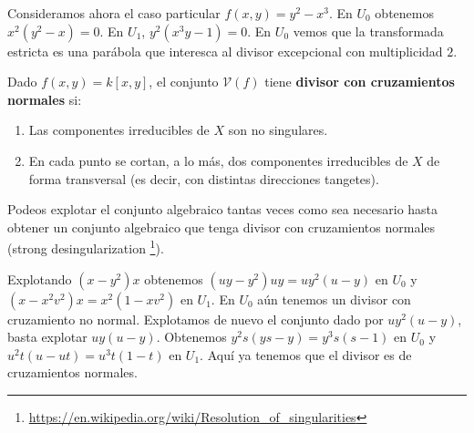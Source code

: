 \documentclass[ACGA.tex]{subfiles}
\begin{document}
Consideramos ahora el caso particular $f(x,y) = y^2-x^3$. En $U_0$ obtenemos $x^2(y^2-x) = 0$. En $U_1$, $y^2(x^3y-1) = 0$. En $U_0$ vemos que la transformada estricta es una parábola que interesca al divisor excepcional con multiplicidad $2$.

\begin{defi}
Dado $f(x,y) = k[x,y]$, el conjunto $\mathcal{V}(f)$ tiene \textbf{divisor con cruzamientos normales} si:
\begin{enumerate}
	\item Las componentes irreducibles de $X$ son no singulares.
	\item En cada punto se cortan, a lo más, dos componentes irreducibles de $X$ de forma transversal (es decir, con distintas direcciones tangetes).
\end{enumerate}
\end{defi}

Podeos explotar el conjunto algebraico tantas veces como sea necesario hasta obtener un conjunto algebraico que tenga divisor con cruzamientos normales (strong desingularization \footnote{\url{https://en.wikipedia.org/wiki/Resolution_of_singularities}}).
\begin{ej}
Explotando $(x-y^2)x$ obtenemos $(uy-y^2)uy=uy^2(u-y)$ en $U_0$ y $(x-x^2v^2)x=x^2(1-xv^2)$ en $U_1$. En $U_0$ aún tenemos un divisor con cruzamiento no normal. Explotamos de nuevo el conjunto dado por $uy^2(u-y)$, basta explotar $uy(u-y)$. Obtenemos $y^2s(ys-y)=y^3s(s-1)$ en $U_0$ y $u^2t(u-ut)=u^3t(1-t)$ en $U_1$. Aquí ya tenemos que el divisor es de cruzamientos normales.
\end{ej}
\end{document}
